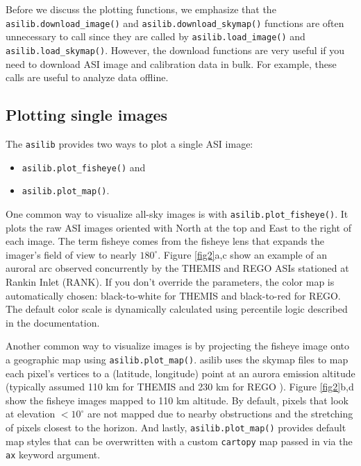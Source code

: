 \documentclass[utf8]{FrontiersinHarvard} %
\begin{document}
Before we discuss the plotting functions, we emphasize that the \verb|asilib.download_image()| and \verb|asilib.download_skymap()| functions are often unnecessary to call since they are called by \verb|asilib.load_image()| and \verb|asilib.load_skymap()|. However, the download functions are very useful if you need to download ASI image and calibration data in bulk. For example, these calls are useful to analyze data offline.

\subsection{Plotting single images}

The \verb|asilib| provides two ways to plot a single ASI image:

\begin{itemize}
      \item \verb|asilib.plot_fisheye()| and
      \item \verb|asilib.plot_map()|.
\end{itemize}

One common way to visualize all-sky images is with \verb|asilib.plot_fisheye()|. It plots the raw ASI images oriented with North at the top and East to the right of each image. The term fisheye comes from the fisheye lens that expands the imager's field of view to nearly $180^\circ$. Figure \ref{fig2}a,c show an example of an auroral arc observed concurrently by the THEMIS and REGO ASIs stationed at Rankin Inlet (RANK). If you don't override the parameters, the color map is automatically chosen: black-to-white for THEMIS and black-to-red for REGO. The default color scale is dynamically calculated using percentile logic described in the documentation.

Another common way to visualize images is by projecting the fisheye image onto a geographic map using \verb|asilib.plot_map()|. asilib uses the skymap files to map each pixel's vertices to a (latitude, longitude) point at an aurora emission altitude (typically assumed 110 km for THEMIS and 230 km for REGO \cite{Donovan2006, Liang2016}). Figure \ref{fig2}b,d show the fisheye images mapped to 110 km altitude. By default, pixels that look at elevation $< 10^\circ$ are not mapped due to nearby obstructions and the stretching of pixels closest to the horizon. And lastly, \verb|asilib.plot_map()| provides default map styles that can be overwritten with a custom \verb|cartopy| \cite{Cartopy} map passed in via the \verb|ax| keyword argument.
\end{document}
